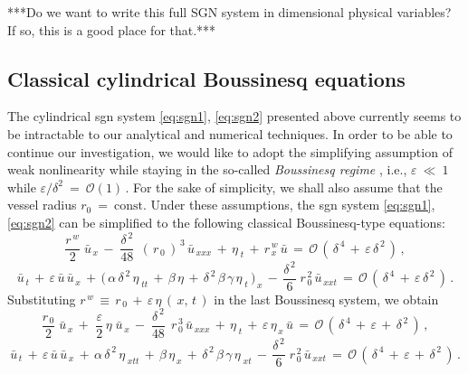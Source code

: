 \documentclass[alpha-refs, 12pt]{wiley-article}
\renewcommand{\O}{\mathcal{O}}
\newcommand{\eps}{\varepsilon}
\begin{document}
{\color{red}***Do we want to write this full SGN system in dimensional physical variables? If so, this is a good place for that.***}

\subsection{Classical cylindrical Boussinesq equations}

The cylindrical \acrshort{sgn} system \eqref{eq:sgn1}, \eqref{eq:sgn2} presented above currently seems to be intractable to our analytical and numerical techniques. In order to be able to continue our investigation, we would like to adopt the simplifying assumption of weak nonlinearity while staying in the so-called \emph{Boussinesq regime} \citep{DMII, Dutykh2014f, Dutykh2007, DMS1, cheviakov2024analytical}, i.e., $\eps\ \ll\ 1$ while ${\eps}/{\delta^2}\ =\ \O(1)\,$. For the sake of simplicity, we shall also assume that the vessel radius $r_0\ =\ \mathrm{const}$. Under these assumptions, the \acrshort{sgn} system \eqref{eq:sgn1}, \eqref{eq:sgn2} can be simplified to the following classical Boussinesq-type equations:
\begin{equation}\label{eq:5.1}
  \frac{r^{\,w}}{2}\;\bar{u}_{\,x}\,-\;\frac{\delta^{\,2}}{48}\;\,(\,r_{\,0}\,)^{\,3}\,\bar{u}_{\,xxx}\,+\,\eta_{\;t}\,+\,r^{\,w}_{\,x}\,\bar{u}\,=\,\O\,(\,\delta^{\,4}\,+\,\eps\,\delta^{\,2}\,)\,,
\end{equation}
\begin{equation}\label{eq:5.2}
  \bar{u}_{\,t}\, + \,\eps\,\bar{u}\,\bar{u}_{\,x}\, + \,\bigl(\,\alpha\,\delta^{\,2}\,\eta_{\;tt}\, + \,\beta\,\eta\, + \,\delta^{\,2}\,\beta\,\gamma\,\eta_{\;t}\,\bigr)_{\,x}\, - \,\frac{\delta^{\,2}}{6}\;r_{\,0}^{\,2}\,\bar{u}_{\,xxt}\, =\, \O\,(\,\delta^{\,4}\,+\,\eps\,\delta^{\,2}\,)\,.
\end{equation}
Substituting $r^{\,w}\,\equiv\, r_{\,0}\,+\,\eps\,\eta\,(\,x,\,t\,)$ in the last Boussinesq system, we obtain
\begin{equation*}
  \frac{r_{\,0}}{2}\;\bar{u}_{\,x}\, + \,\,\frac{\eps}{2}\,\eta\;\bar{u}_{\,x}\, -\;\frac{\delta^{\,2}}{48}\;\,r_{\,0}^{\,3}\,\bar{u}_{\,xxx}\, + \,\eta_{\;t}\, + \,\eps\,\eta_{\,x}\,\bar{u}\, = \,\O\,(\,\delta^{\,4}\,+\,\eps\,+\,\delta^{\,2}\,)\,,
\end{equation*}
\begin{equation*}
  \bar{u}_{\,t}\, + \,\eps\,\bar{u}\,\bar{u}_{\,x}\, + \,\alpha\,\delta^{\,2}\,\eta_{\;xtt}\, + \,\beta\,\eta_{\,x}\, + \,\delta^{\,2}\,\beta\,\gamma\,\eta_{\;xt}\, - \,\frac{\delta^{\,2}}{6}\;r_{\,0}^{\,2}\,\bar{u}_{\,xxt}\, = \,\O\,(\,\delta^{\,4}\,+\,\eps\,+\,\delta^{\,2}\,)\,.
\end{equation*}
\end{document}
